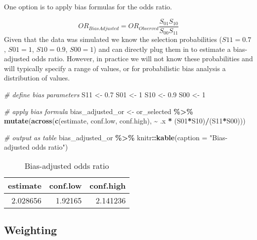 \documentclass[
]{book}
\newenvironment{Shaded}{\begin{snugshade}}{\end{snugshade}}
\newcommand{\AttributeTok}[1]{\textcolor[rgb]{0.13,0.29,0.53}{#1}}
\newcommand{\CommentTok}[1]{\textcolor[rgb]{0.56,0.35,0.01}{\textit{#1}}}
\newcommand{\DecValTok}[1]{\textcolor[rgb]{0.00,0.00,0.81}{#1}}
\newcommand{\FloatTok}[1]{\textcolor[rgb]{0.00,0.00,0.81}{#1}}
\newcommand{\FunctionTok}[1]{\textcolor[rgb]{0.13,0.29,0.53}{\textbf{#1}}}
\newcommand{\NormalTok}[1]{#1}
\newcommand{\OtherTok}[1]{\textcolor[rgb]{0.56,0.35,0.01}{#1}}
\newcommand{\SpecialCharTok}[1]{\textcolor[rgb]{0.81,0.36,0.00}{\textbf{#1}}}
\newcommand{\StringTok}[1]{\textcolor[rgb]{0.31,0.60,0.02}{#1}}
\begin{document}
One option is to apply bias formulas for the odds ratio.

\[
OR_{BiasAdjusted} = OR_{Observed}\frac{S_{01}S_{10}}{S_{00}S_{11}}
\]
Given that the data was simulated we know the selection probabilities (\(S11=0.7\), \(S01=1\), \(S10=0.9\), \(S00=1\)) and can directly plug them in to estimate a bias-adjusted odds ratio. However, in practice we will not know these probabilities and will typically specify a range of values, or for probabilistic bias analysis a distribution of values.

\begin{Shaded}
\begin{Highlighting}[]
\CommentTok{\# define bias parameters}
\NormalTok{S11 }\OtherTok{\textless{}{-}} \FloatTok{0.7}
\NormalTok{S01 }\OtherTok{\textless{}{-}} \DecValTok{1}
\NormalTok{S10 }\OtherTok{\textless{}{-}} \FloatTok{0.9}
\NormalTok{S00 }\OtherTok{\textless{}{-}} \DecValTok{1}

\CommentTok{\# apply bias formula}
\NormalTok{bias\_adjusted\_or }\OtherTok{\textless{}{-}}\NormalTok{ or\_selected }\SpecialCharTok{\%\textgreater{}\%} 
  \FunctionTok{mutate}\NormalTok{(}\FunctionTok{across}\NormalTok{(}\FunctionTok{c}\NormalTok{(estimate, conf.low, conf.high), }\SpecialCharTok{\textasciitilde{}}\NormalTok{ .x }\SpecialCharTok{*}\NormalTok{ (S01}\SpecialCharTok{*}\NormalTok{S10)}\SpecialCharTok{/}\NormalTok{(S11}\SpecialCharTok{*}\NormalTok{S00)))}

\CommentTok{\# output as table}
\NormalTok{bias\_adjusted\_or }\SpecialCharTok{\%\textgreater{}\%} 
\NormalTok{  knitr}\SpecialCharTok{::}\FunctionTok{kable}\NormalTok{(}\AttributeTok{caption =} \StringTok{"Bias{-}adjusted odds ratio"}\NormalTok{)}
\end{Highlighting}
\end{Shaded}

\begin{table}

\caption{\label{tab:unnamed-chunk-9}Bias-adjusted odds ratio}
\centering
\begin{tabular}[t]{r|r|r}
\hline
estimate & conf.low & conf.high\\
\hline
2.028656 & 1.92165 & 2.141236\\
\hline
\end{tabular}
\end{table}

\hypertarget{weighting}{%
\subsection{Weighting}\label{weighting}}
\end{document}
